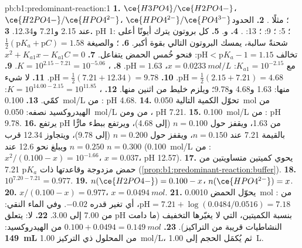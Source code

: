 \begin{solution}{pb:b1:predominant-reaction:1}
\textbf{1.} $\ce{H3PO4}/\ce{H2PO4-}$، $\ce{H2PO4-}/\ce{HPO4^{2-}}$،
$\ce{HPO4^{2-}}/\ce{PO4^{3-}}$؛ مثلًا .
\textbf{2.} الحدود عند 2.15 و7.21 و12.34.
\textbf{3.} pH 1: ؛ 5: ؛ 9: ؛ 13:
.
\textbf{4.}  و.
\textbf{5.} كل بروتون يترك أيونًا أعلى شحنةً سالبة، يمسك
البروتون التالي بقوة أكبر.
\textbf{6.} ؛ والصيغة
$\frac12(\mathrm{p}K_a + \mathrm{p}C) = 1.58$ تخالف $\mathrm{pH} <
\mathrm{p}K_a - 1 = 1.15$: فنحو خُمس الحمض يتفاعل.
\textbf{7.} $x^2 + K_{a1}x - K_{a1}C = 0$ مع $K_{a1} = 10^{-2.15}$: $x =
\qty{0.0233}{mol/L}$، $\mathrm{pH} = 1.63$.
\textbf{8.} ، $K = 10^{2.15 - 7.21} =
10^{-5.06}$.
\textbf{9.} $\mathrm{pH} = \frac12(2.15 + 7.21) = 4.68$.
\textbf{10.} $\mathrm{pH} = \frac12(7.21 + 12.34) = 9.78$.
\textbf{11.} لا شيء منها: 1.63 و4.68 و9.78؛ ويلزم خليط من اثنين
منها.
\textbf{12.} ، $K = 10^{14.00 - 2.15} =
10^{11.85}$: كمّي.
\textbf{13.} \qty{0.100}{mol/L} من : pH 4.68.
\textbf{14.} تحوّل الكمية التالية \qty{0.050}{mol} من الهيدروكسيد نصفه:
\qty{0.050}{mol/L} من  ومن ، pH 7.21.
\textbf{15.} \qty{0.100}{mol/L} من : pH 9.78.
\textbf{16.} يرتفع pH من 1.63، ويقفز حول $n = 0.100$ (إلى 4.68)،
ويرتفع ببطء مارًّا بالقيمة 7.21 عند $n = 0.150$، ويقفز حول $n = 0.200$ (إلى
9.78)، ويتجاوز 12.34 قرب $n = 0.250$ ويبلغ نحو 12.6 عند $n = 0.300$ (\qty{0.100}{mol/L} من : $x^2/(0.100 - x) = 10^{-1.66}$، $x = 0.037$، pH 12.57).
\textbf{17.} يحوي كميتين متساويتين من حمض مزدوجة وقاعدتها
ذات $\mathrm{p}K_a$ 7.21 (\cref{prop:b1:predominant-reaction:buffer}).
\textbf{18.} $10^{7.20 - 7.21} = 0.977$.
\textbf{19.} $n(\ce{H2PO4-}) = 0.100 - x$، $n(\ce{HPO4^{2-}}) = x$.
\textbf{20.} $x/(0.100 - x) = 0.977$، $x = \qty{0.0494}{mol}$.
\textbf{21.} يحوّل الحمض \qty{0.0010}{mol} من :
$\mathrm{pH} = 7.21 + \log(0.0484/0.0516) = 7.18$، أي تغير قدره $-0.02$. وفي
الماء النقي: من 7.00 إلى 3.00.
\textbf{22.} لا: يتعلق pH بنسبة الكميتين، التي لا يغيّرها
التخفيف (ما دامت النشاطيات قريبة من
التراكيز).
\textbf{23.} $0.100 + 0.0494 = \qty{0.149}{mol}$ من الهيدروكسيد: \textbf{\qty{149}{mL}}
من المحلول ذي التركيز \qty{1.00}{mol/L}، ثم يُكمَل الحجم إلى \qty{1.00}{L}.
\end{solution}
